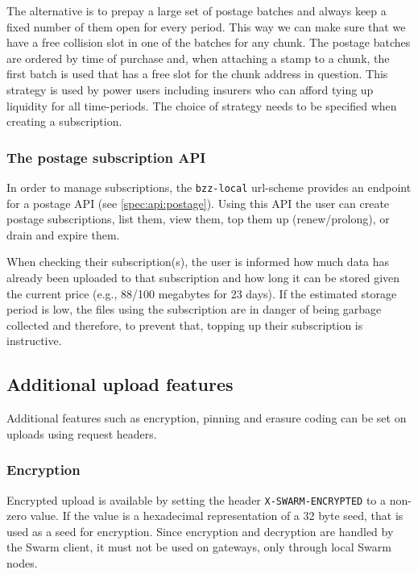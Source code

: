 The alternative is to prepay a large set of postage batches and always keep a fixed number of them open for every period. This way we can make sure that we have a free collision slot in one of the batches for any chunk. The postage batches are ordered by time of purchase and, when attaching a stamp to a chunk, the first batch is used that has a free slot for the chunk address in question. This strategy is used by power users including insurers who can afford tying up liquidity for all time-periods. The  choice of strategy needs to be specified when creating a subscription.

\subsubsection{The postage subscription API}

In order to manage subscriptions, the \texttt{bzz-local} url-scheme provides an endpoint for a postage API (see  \ref{spec:api:postage}). Using this API the user can create postage subscriptions, list them, view them, top them up (renew/prolong), or drain and expire them. 

When checking their subscription(s), the user is informed how much data has already been uploaded to that subscription and how long it can be stored given the current price (e.g., 88/100 megabytes for 23 days). If the estimated storage period is low, the files using the subscription are in danger of being garbage collected and therefore, to prevent that, topping up their subscription is instructive.



\subsection{Additional upload features}\label{sec:features}

Additional features such as encryption, pinning and erasure coding can be set on uploads using request headers. 


\subsubsection{Encryption}

Encrypted upload is available by setting the header \texttt{X-SWARM-ENCRYPTED} to a non-zero value. If the value is a hexadecimal representation of a 32 byte seed, that is used as a seed for encryption. Since encryption and decryption are handled by the Swarm client, it must not be used on gateways, only through local Swarm nodes.

